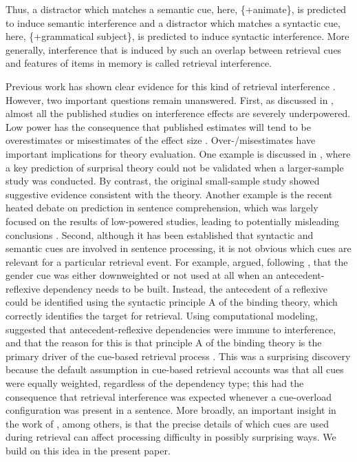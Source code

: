 \documentclass[a4paper, man, floatsintext]{apa7}
\begin{document}
Thus, a distractor which matches a semantic cue, here, \{+animate\}, is predicted to induce semantic interference and a distractor which matches a syntactic cue, here, \{+grammatical subject\}, is predicted to induce syntactic interference. More generally, interference that is induced by such an overlap between retrieval cues and features of items in memory is called retrieval interference. 

Previous work has shown clear evidence for this kind of retrieval interference \parencite{vandyke07, vandyke_mcelree06, vandyke_mcelree2011, nicenboim,  vandyke_lewis03,jaeger_etal_2017}.
However, two important questions remain unanswered. First, as discussed in \textcite{jaeger_etal_2017}, almost all the published studies on interference effects are severely underpowered. Low power has the consequence that published estimates will tend to be overestimates or misestimates of the effect size \parencite{vasishth2018_signficancefilter}. Over-/misestimates have important implications for theory evaluation. One example is discussed in \textcite{vasishth2018_signficancefilter}, where a key prediction of surprisal theory \parencite{levy&keller_2013} could not be validated when a larger-sample study was conducted. By contrast, the original small-sample study \parencite{levy&keller_2013} showed suggestive evidence consistent with the theory. Another example is the recent heated debate \parencite{nieuwland_etal_2018} on prediction in sentence comprehension, which was largely focused on the results of low-powered studies, leading to potentially misleading conclusions \parencite{nicenboim_etal_2020}.
Second, although it has been established \parencite[e.g.,][]{vandyke07,mertzen} that syntactic and semantic cues are involved in sentence processing, it is not obvious which cues are relevant for a particular retrieval event. For example, \textcite{dillon2013} argued, following \textcite{Sturt2003}, that the gender cue was either downweighted or not used at all when an antecedent-reflexive dependency needs to be built. Instead, the antecedent of a reflexive could be identified using the syntactic principle A of the binding theory, which correctly identifies the target for retrieval.  Using computational modeling, \textcite{dillon2013} suggested that antecedent-reflexive dependencies were immune to interference, and that the reason for this is that principle A of the binding theory is the primary driver of the cue-based retrieval process \parencite[cf. ][]{jaeger_etal_2020,yadav2021individual}. This was a surprising discovery because the default assumption in cue-based retrieval accounts was that all cues were equally weighted, regardless of the dependency type; this had the consequence that retrieval interference was expected whenever a cue-overload configuration was present in a sentence. More broadly, an important insight in the work of \textcite{dillon2013}, among others, is that  the precise details of which cues are used during retrieval can affect processing difficulty in possibly surprising ways. We build on this idea in the present paper.
\end{document}
